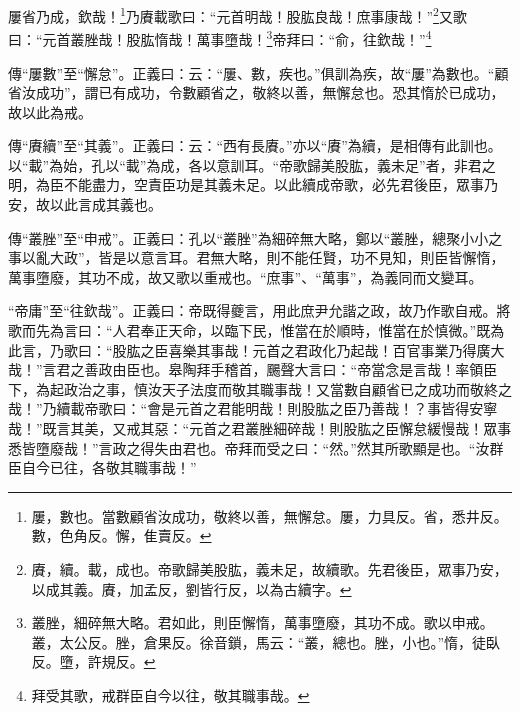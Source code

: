 屢省乃成，欽哉！\footnote{屢，數也。當數顧省汝成功，敬終以善，無懈怠。屢，力具反。省，悉井反。數，色角反。懈，隹賣反。}乃賡載歌曰：“元首明哉！股肱良哉！庶事康哉！”\footnote{賡，續。載，成也。帝歌歸美股肱，義未足，故續歌。先君後臣，眾事乃安，以成其義。賡，加孟反，劉皆行反，以為古續字。}又歌曰：“元首叢脞哉！股肱惰哉！萬事墮哉！\footnote{叢脞，細碎無大略。君如此，則臣懈惰，萬事墮廢，其功不成。歌以申戒。叢，太公反。脞，倉果反。徐音鎖，馬云：“叢，總也。脞，小也。”惰，徒臥反。墮，許規反。}帝拜曰：“俞，往欽哉！”\footnote{拜受其歌，戒群臣自今以往，敬其職事哉。}

{\noindent\zhuan{}\fzbyks 傳“屢數”至“懈怠”。正義曰：云：“屢、數，疾也。”俱訓為疾，故“屢”為數也。“顧省汝成功”，謂已有成功，令數顧省之，敬終以善，無懈怠也。恐其惰於已成功，故以此為戒。 \par}

{\noindent\zhuan{}\fzbyks 傳“賡續”至“其義”。正義曰：云：“西有長賡。”亦以“賡”為續，是相傳有此訓也。以“載”為始，孔以“載”為成，各以意訓耳。“帝歌歸美股肱，義未足”者，非君之明，為臣不能盡力，空責臣功是其義未足。以此續成帝歌，必先君後臣，眾事乃安，故以此言成其義也。 \par}

{\noindent\zhuan{}\fzbyks 傳“叢脞”至“申戒”。正義曰：孔以“叢脞”為細碎無大略，鄭以“叢脞，總聚小小之事以亂大政”，皆是以意言耳。君無大略，則不能任賢，功不見知，則臣皆懈惰，萬事墮廢，其功不成，故又歌以重戒也。“庶事”、“萬事”，為義同而文變耳。 \par}

{\noindent\shu{}\fzkt “帝庸”至“往欽哉”。正義曰：帝既得夔言，用此庶尹允諧之政，故乃作歌自戒。將歌而先為言曰：“人君奉正天命，以臨下民，惟當在於順時，惟當在於慎微。”既為此言，乃歌曰：“股肱之臣喜樂其事哉！元首之君政化乃起哉！百官事業乃得廣大哉！”言君之善政由臣也。皋陶拜手稽首，颺聲大言曰：“帝當念是言哉！率領臣下，為起政治之事，慎汝天子法度而敬其職事哉！又當數自顧省已之成功而敬終之哉！”乃續載帝歌曰：“會是元首之君能明哉！則股肱之臣乃善哉！？事皆得安寧哉！”既言其美，又戒其惡：“元首之君叢脞細碎哉！則股肱之臣懈怠緩慢哉！眾事悉皆墮廢哉！”言政之得失由君也。帝拜而受之曰：“然。”然其所歌顯是也。“汝群臣自今已往，各敬其職事哉！” \par}


